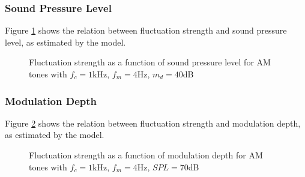 \documentclass[a4paper]{article}
\begin{document}
\subsubsection{Sound Pressure Level}

Figure \ref{fig:AMtonesSPLplot} shows the relation between fluctuation strength
and sound pressure level, as estimated by the model.

\begin{figure}[ht]
    \centering
    \resizebox{!}{8cm}{
        
    }
    \caption{Fluctuation strength as a function of sound pressure level for AM
        tones with $f_c = 1 $kHz, $f_m = 4 $Hz, $m_d = 40 $dB}
    \label{fig:AMtonesSPLplot}
\end{figure}

\subsubsection{Modulation Depth}

Figure \ref{fig:AMtonesmdplot} shows the relation between fluctuation strength
and modulation depth, as estimated by the model.

\begin{figure}[ht]
    \centering
    \resizebox{!}{8cm}{
        
    }
    \caption{Fluctuation strength as a function of modulation depth for AM tones
        with $f_c = 1 $kHz, $f_m = 4 $Hz, $SPL = 70 $dB}
    \label{fig:AMtonesmdplot}
\end{figure}
\end{document}
